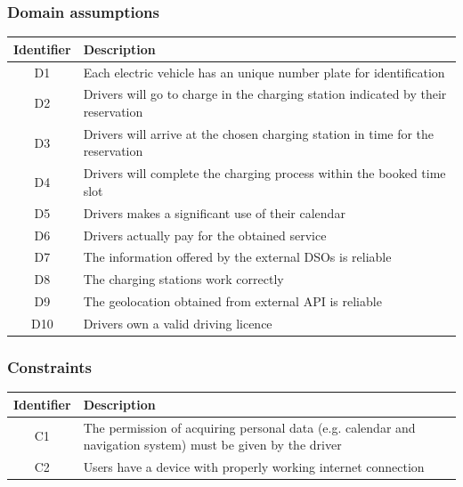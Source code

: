 \documentclass[../main.tex]{subfiles}
\begin{document}
\subsubsection{Domain assumptions}
\begin{center}
\begin{longtable}{| c | p{12cm} | } 
\hline
\textbf{Identifier} & \textbf{Description} \\
\hline
D1 & Each electric vehicle has an unique number plate for identification \\
\hline
D2 & Drivers will go to charge in the charging station indicated by their reservation\\
\hline
D3 & Drivers will arrive at the chosen charging station in time for the reservation \\
\hline
D4 & Drivers will complete the charging process within the booked time slot \\
\hline
D5 & Drivers makes a significant use of their calendar \\
\hline
D6 & Drivers actually pay for the obtained service \\
\hline
D7 & The information offered by the external DSOs is reliable \\
\hline
D8 & The charging stations work correctly \\
\hline
D9 & The geolocation obtained from external API is reliable \\
\hline
D10 & Drivers own a valid driving licence \\
\hline
\end{longtable}
\end{center}

\subsubsection{Constraints}
\begin{center}
\begin{longtable}{| c | p{12cm} | } 
\hline
\textbf{Identifier} & \textbf{Description} \\
\hline
C1 & The permission of acquiring personal data (e.g. calendar and navigation system) must be given by the driver \\
\hline
C2 & Users have a device with properly working internet connection \\
\hline
\end{longtable}
\end{center}
\end{document}
